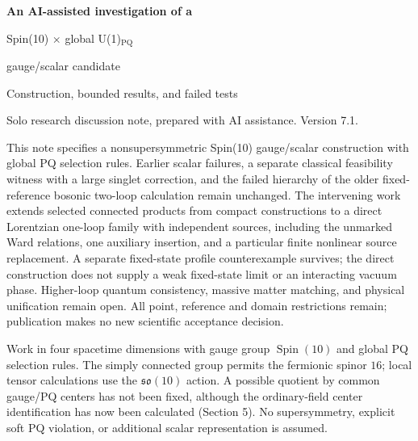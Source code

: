\documentclass[10pt,letterpaper]{article}
\newcommand{\PQ}{\mathrm{PQ}}
\newcommand{\Spin}{\operatorname{Spin}}
\newcommand{\sect}[1]{\vspace{5pt}{\large\bfseries\color{ink}#1}\par}
\begin{document}
\thispagestyle{draft}
{\LARGE\bfseries\color{ink} An AI-assisted investigation of a\par
Spin(10) $\times$ global U(1)$_{\PQ}$\par
gauge/scalar candidate\par}
\vspace{4pt}
{\large Construction, bounded results, and failed tests}\par
{\small Solo research discussion note, prepared with AI assistance. Version 7.1.}

\sect{Abstract}
This note specifies a nonsupersymmetric Spin(10) gauge/scalar construction
with global PQ selection rules. Earlier scalar failures, a separate classical
feasibility witness with a large singlet correction, and the failed hierarchy
of the older fixed-reference bosonic two-loop calculation remain unchanged.
The intervening work extends selected connected products from compact
constructions to a direct Lorentzian one-loop family with independent
sources, including the unmarked Ward relations, one auxiliary insertion,
and a particular finite nonlinear source replacement. A separate
fixed-state profile counterexample survives; the direct construction
does not supply a weak fixed-state limit or an interacting vacuum phase.
Higher-loop quantum consistency, massive matter matching, and physical
unification remain open.
All point, reference and domain restrictions remain; publication makes no
new scientific acceptance decision.

\sect{1. Assumptions and fields}
Work in four spacetime dimensions with gauge group $\Spin(10)$ and global PQ
selection rules. The simply connected group permits the fermionic spinor $16$;
local tensor calculations use the $\mathfrak{so}(10)$ action. A possible quotient
by common gauge/PQ centers has not been fixed, although the ordinary-field
center identification has now been calculated (Section 5). No supersymmetry, explicit soft
PQ violation, or additional scalar representation is assumed.
\end{document}
